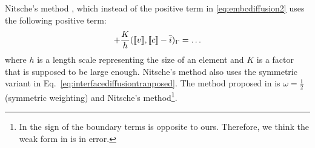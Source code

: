 \begin{enumerate}
Nitsche's method \cite{Nitsche71}, which instead of the positive term
in \eqref{eq:embcdiffusion2} uses the following positive term:
\begin{equation}
   + \frac{K}{h}(\text{[\![} v\text{]\!]},\text{[\![} c\text{]\!]}-\bar i)_\Gamma = \ldots
   \label{eq:Nitscheinterface}
\end{equation}
where $h$ is a length scale representing the size of an element and
$K$ is a factor that is supposed to be large enough. Nitsche's method also
uses the symmetric variant in Eq.~\eqref{eq:interfacediffusiontranposed}.
The method proposed in \cite{dolbow2009,dolbow2010} is $\omega=\tfrac12$
(symmetric weighting) and Nitsche's method\footnote{In
\cite{dolbow2009,dolbow2010} the sign of the boundary terms is opposite to
ours. Therefore, we think the weak form in \cite{dolbow2009,dolbow2010} is
in error.}.
\end{enumerate}

